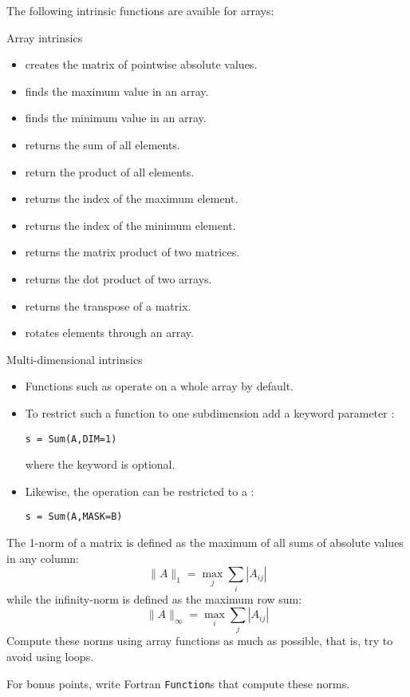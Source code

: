 The following intrinsic functions are avaible for arrays:
\begin{block}{Array intrinsics}
  \label{sl:array-funcf}
  \begin{itemize}
  \item {} creates the matrix of pointwise absolute values.
  \item {} finds the maximum value in an array.
  \item {} finds the minimum value in an array.
  \item {} returns the sum of all elements.
  \item {} return the product of all elements.
  \item {} returns the index of the maximum
    element.
  \item {} returns the index of the minimum element.
  \item {} returns the matrix product of two matrices.
  \item {} returns the dot product of two
    arrays.
  \item {} returns the transpose of a matrix.
  \item {} rotates elements through an array.
  \end{itemize}
\end{block}

\begin{block}{Multi-dimensional intrinsics}
  \label{sl:array-funcfmd}
  \begin{itemize}
  \item
    Functions such as  operate on a whole array by
    default.
  \item To
    restrict such a function to one subdimension add a keyword
    parameter :
\begin{lstlisting}
s = Sum(A,DIM=1)
\end{lstlisting}
where the keyword is optional.
\item Likewise, the operation can be restricted to a :
\begin{lstlisting}
s = Sum(A,MASK=B)
\end{lstlisting}
  \end{itemize}
\end{block}

\begin{exercise}
  \label{ex:fmatnorm}
  The 1-norm of a matrix is defined as the maximum of all sums of absolute
  values in any column:
  \[ \|A\|_1 = \max_j \sum_i |A_{ij}| \]
  while the infinity-norm is defined as the maximum row sum:
  \[ \|A\|_\infty = \max_i \sum_j |A_{ij}| \]
  Compute these norms using array functions as much as possible, that
  is, try to avoid using loops.
  
  For bonus points, write Fortran \lstinline{Function}s that compute
  these norms.
\end{exercise}

